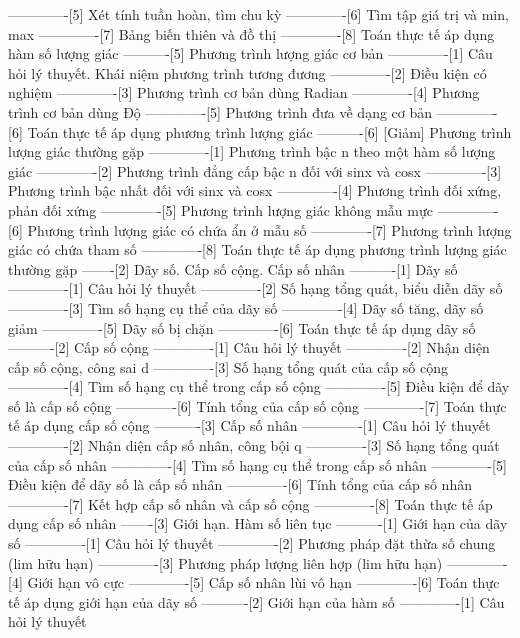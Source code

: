 -------------[5] Xét tính tuần hoàn, tìm chu kỳ
-------------[6] Tìm tập giá trị và min, max
-------------[7] Bảng biến thiên và đồ thị
-------------[8] Toán thực tế áp dụng hàm số lượng giác
----------[5] Phương trình lượng giác cơ bản
-------------[1] Câu hỏi lý thuyết. Khái niệm phương trình tương đương
-------------[2] Điều kiện có nghiệm
-------------[3] Phương trình cơ bản dùng Radian
-------------[4] Phương trình cơ bản dùng Độ
-------------[5] Phương trình đưa về dạng cơ bản
-------------[6] Toán thực tế áp dụng phương trình lượng giác
----------[6] [Giảm] Phương trình lượng giác thường gặp
-------------[1] Phương trình bậc n theo một hàm số lượng giác
-------------[2] Phương trình đẳng cấp bậc n đối với sinx và cosx
-------------[3] Phương trình bậc nhất đối với sinx và cosx
-------------[4] Phương trình đối xứng, phản đối xứng
-------------[5] Phương trình lượng giác không mẫu mực
-------------[6] Phương trình lượng giác có chứa ẩn ở mẫu số
-------------[7] Phương trình lượng giác có chứa tham số
-------------[8] Toán thực tế áp dụng phương trình lượng giác thường gặp
-------[2] Dãy số. Cấp số cộng. Cấp số nhân
----------[1] Dãy số
-------------[1] Câu hỏi lý thuyết
-------------[2] Số hạng tổng quát, biểu diễn dãy số
-------------[3] Tìm số hạng cụ thể của dãy số
-------------[4] Dãy số tăng, dãy số giảm
-------------[5] Dãy số bị chặn
-------------[6] Toán thực tế áp dụng dãy số
----------[2] Cấp số cộng
-------------[1] Câu hỏi lý thuyết
-------------[2] Nhận diện cấp số cộng, công sai d
-------------[3] Số hạng tổng quát của cấp số cộng
-------------[4] Tìm số hạng cụ thể trong cấp số cộng
-------------[5] Điều kiện để dãy số là cấp số cộng
-------------[6] Tính tổng của cấp số cộng
-------------[7] Toán thực tế áp dụng cấp số cộng
----------[3] Cấp số nhân
-------------[1] Câu hỏi lý thuyết
-------------[2] Nhận diện cấp số nhân, công bội q
-------------[3] Số hạng tổng quát của cấp số nhân
-------------[4] Tìm số hạng cụ thể trong cấp số nhân
-------------[5] Điều kiện để dãy số là cấp số nhân
-------------[6] Tính tổng của cấp số nhân
-------------[7] Kết hợp cấp số nhân và cấp số cộng
-------------[8] Toán thực tế áp dụng cấp số nhân
-------[3] Giới hạn. Hàm số liên tục
----------[1] Giới hạn của dãy số
-------------[1] Câu hỏi lý thuyết
-------------[2] Phương pháp đặt thừa số chung (lim hữu hạn)
-------------[3] Phương pháp lượng liên hợp (lim hữu hạn)
-------------[4] Giới hạn vô cực
-------------[5] Cấp số nhân lùi vô hạn
-------------[6] Toán thực tế áp dụng giới hạn của dãy số
----------[2] Giới hạn của hàm số
-------------[1] Câu hỏi lý thuyết
